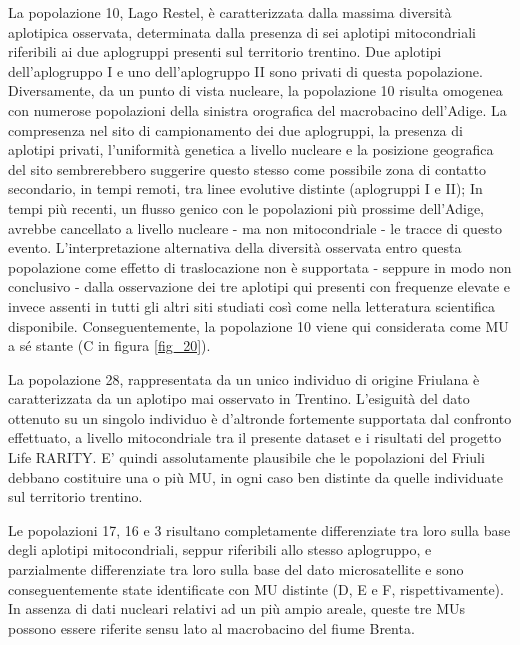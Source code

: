 \documentclass[11pt,a4paper,italian,twoside,openany]{memoir}
\begin{document}
La popolazione 10, Lago Restel, è caratterizzata dalla massima diversità aplotipica osservata, determinata dalla presenza di sei aplotipi mitocondriali riferibili ai due aplogruppi presenti sul territorio trentino. Due aplotipi dell'aplogruppo I e uno dell'aplogruppo II sono privati di questa popolazione. Diversamente, da un punto di vista nucleare, la popolazione 10 risulta omogenea con numerose popolazioni della sinistra orografica del macrobacino dell'Adige. La compresenza nel sito di campionamento dei due aplogruppi, la presenza di aplotipi privati, l'uniformità genetica a livello nucleare e la posizione geografica del sito sembrerebbero suggerire questo stesso come possibile zona di contatto secondario, in tempi remoti, tra linee evolutive distinte (aplogruppi I e II); In tempi più recenti, un flusso genico con le popolazioni più prossime dell'Adige, avrebbe cancellato a livello nucleare - ma non mitocondriale - le tracce di questo evento. L'interpretazione alternativa della diversità osservata entro questa popolazione come effetto di traslocazione non è supportata - seppure in modo non conclusivo - dalla osservazione dei tre aplotipi qui presenti con frequenze elevate e invece assenti in tutti gli altri siti studiati così come nella letteratura scientifica disponibile. Conseguentemente, la popolazione 10 viene qui considerata come MU a sé stante (C in figura \ref{fig_20}).

La popolazione 28, rappresentata da un unico individuo di origine Friulana è caratterizzata da un aplotipo mai osservato in Trentino. L'esiguità del dato ottenuto su un singolo individuo è d'altronde fortemente supportata dal confronto effettuato, a livello mitocondriale tra il presente dataset e i risultati del progetto Life RARITY. E' quindi assolutamente plausibile che le popolazioni del Friuli debbano costituire una o più MU, in ogni caso ben distinte da quelle individuate sul territorio trentino. 

Le popolazioni 17, 16 e 3 risultano completamente differenziate tra loro sulla base degli aplotipi mitocondriali, seppur riferibili allo stesso aplogruppo, e parzialmente differenziate tra loro sulla base del dato microsatellite e sono conseguentemente state identificate con MU distinte (D, E e F, rispettivamente). In assenza di dati nucleari relativi ad un più ampio areale, queste tre MUs possono essere riferite sensu lato al macrobacino del fiume Brenta.
\end{document}
